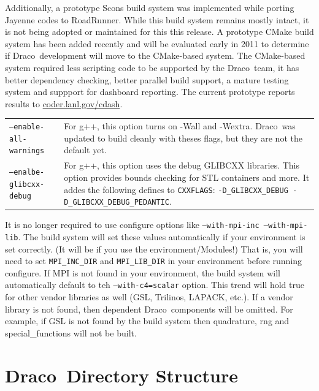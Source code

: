 \documentclass[note]{ResearchNote}
\newcommand{\draco}{Draco}
\newcommand{\tableText}[1]{{\raggedright #1}}
\begin{document}
Additionally, a prototype \textsf{Scons} build system was implemented
while porting Jayenne codes to RoadRunner.  While this build system
remains mostly intact, it is not being adopted or maintained for this
this release. A prototype \textsf{CMake} build system has been added
recently and will be evaluated early in 2011 to determine if
\draco\ development will move to the CMake-based system.  The
CMake-based system required less scripting code to be supported by the
\draco\ team, it has better dependency checking, better parallel build
support, a mature testing system and suppport for dashboard
reporting.  The current prototype reports results to
\url{coder.lanl.gov/cdash}. 

\begin{center}
  \footnotesize
  \begin{tabular}{lp{4.0in}}
\texttt{--enable-all-warnings} & 
     \tableText{For g++, this option turns on -Wall and -Wextra.
       \draco\ was updated to build cleanly with theses flags, but
       they are not the default yet.} \\ 
\texttt{--enalbe-glibcxx-debug} &
     \tableText{For g++, this option uses the debug GLIBCXX
       libraries.  This option provides bounds checking for STL
       containers and more.  It addes the following defines to
       \texttt{CXXFLAGS}: \texttt{-D\_GLIBCXX\_DEBUG
         -D\_GLIBCXX\_DEBUG\_PEDANTIC}. } \\
  \end{tabular}
\end{center}

It is no longer required to use configure options like
\texttt{--with-mpi-inc --with-mpi-lib}.  The build system will set
these values automatically if your environment is set correctly. (It
will be if you use the environment/Modules!)  That is, you will need
to set \texttt{MPI\_INC\_DIR} and \texttt{MPI\_LIB\_DIR} in your
environment before running configure.  If MPI is not found in your
environment, the build system will automatically default to teh
\texttt{--with-c4=scalar} option.  This trend will hold true for other
vendor libraries as well (GSL, Trilinos, LAPACK, etc.).  If a vendor
library is not found, then dependent \draco\ components will be
omitted.  For example, if GSL is not found by the build system then
\textsf{quadrature}, \textsf{rng} and \textsf{special\_functions} will
not be built.


\section{\draco\ Directory Structure}
\end{document}
